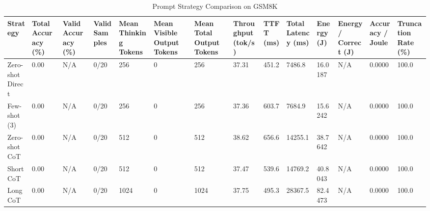 \begin{table}
\caption{Prompt Strategy Comparison on GSM8K}
\label{tab:strategy_comparison}
\begin{tabular}{llllllllllllll}
\toprule
Strategy & Total Accuracy (\%) & Valid Accuracy (\%) & Valid Samples & Mean Thinking Tokens & Mean Visible Output Tokens & Mean Total Output Tokens & Throughput (tok/s) & TTFT (ms) & Total Latency (ms) & Energy (J) & Energy / Correct (J) & Accuracy / Joule & Truncation Rate (\%) \\
\midrule
Zero-shot Direct & 0.00 & N/A & 0/20 & 256 & 0 & 256 & 37.31 & 451.2 & 7486.8 & 16.0187 & N/A & 0.0000 & 100.0 \\
Few-shot (3) & 0.00 & N/A & 0/20 & 256 & 0 & 256 & 37.36 & 603.7 & 7684.9 & 15.6242 & N/A & 0.0000 & 100.0 \\
Zero-shot CoT & 0.00 & N/A & 0/20 & 512 & 0 & 512 & 38.62 & 656.6 & 14255.1 & 38.7642 & N/A & 0.0000 & 100.0 \\
Short CoT & 0.00 & N/A & 0/20 & 512 & 0 & 512 & 37.47 & 539.6 & 14769.2 & 40.8043 & N/A & 0.0000 & 100.0 \\
Long CoT & 0.00 & N/A & 0/20 & 1024 & 0 & 1024 & 37.75 & 495.3 & 28367.5 & 82.4473 & N/A & 0.0000 & 100.0 \\
\bottomrule
\end{tabular}
\end{table}
